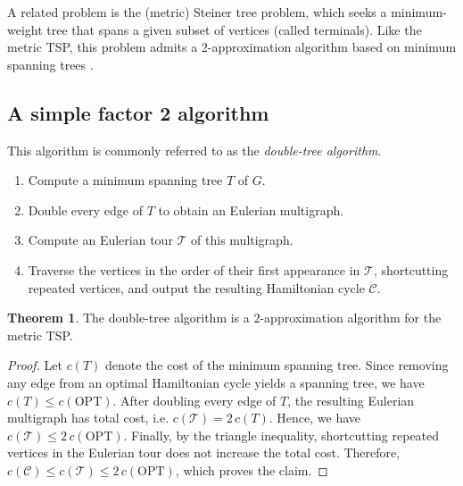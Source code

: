 \documentclass[12pt]{report}
\theoremstyle{definition}
\newtheorem{theorem}{Theorem}
\begin{document}
A related problem is the (metric) Steiner tree problem, which seeks a minimum-weight tree that spans a given subset of vertices (called terminals). Like the metric TSP, this problem admits a 2-approximation algorithm based on minimum spanning trees \cite{vazirani}.

\subsection{A simple factor 2 algorithm}
This algorithm is commonly referred to as the \emph{double-tree algorithm}.

\begin{enumerate}
    \item Compute a minimum spanning tree $T$ of $G$.
    \item Double every edge of $T$ to obtain an Eulerian multigraph.
    \item Compute an Eulerian tour $\mathcal{T}$ of this multigraph.
    \item Traverse the vertices in the order of their first appearance in $\mathcal{T}$, shortcutting repeated vertices, and output the resulting Hamiltonian cycle $\mathcal{C}$.
\end{enumerate}

\begin{theorem}
The double-tree algorithm is a $2$-approximation algorithm for the metric TSP.
\end{theorem}

\begin{proof}
Let $c(T)$ denote the cost of the minimum spanning tree. Since removing any edge from an optimal Hamiltonian cycle yields a spanning tree, we have \(c(T) \leq c(\mathrm{OPT})\). After doubling every edge of $T$, the resulting Eulerian multigraph has total cost, i.e. \(c(\mathcal{T}) = 2\,c(T)\). Hence, we have \(c(\mathcal{T}) \leq 2\,c(\mathrm{OPT})\). Finally, by the triangle inequality, shortcutting repeated vertices in the Eulerian tour does not increase the total cost. Therefore, \(c(\mathcal{C}) \leq c(\mathcal{T}) \leq 2\,c(\mathrm{OPT})\), which proves the claim.
\end{proof}
\end{document}
